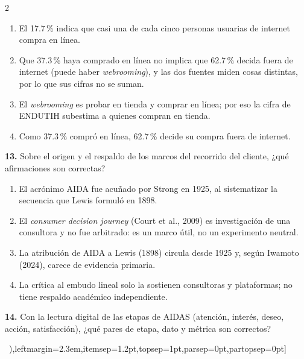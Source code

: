 \documentclass[10pt,letterpaper]{article}
\newcommand{\cas}{\framebox[1.0em]{\rule{0pt}{1.05ex}}}
\begin{document}
\begin{multicols}{2}
\begin{minipage}[t]{\columnwidth}
\begin{enumerate}[label=\cas\ \alph*),leftmargin=2.3em,itemsep=1.2pt,topsep=1pt,parsep=0pt,partopsep=0pt]
\item El 17.7\,\% indica que casi una de cada cinco personas usuarias de internet compra en línea.
\item Que 37.3\,\% haya comprado en línea no implica que 62.7\,\% decida fuera de internet (puede haber \textit{webrooming}), y las dos fuentes miden cosas distintas, por lo que sus cifras no se suman.
\item El \textit{webrooming} es probar en tienda y comprar en línea; por eso la cifra de ENDUTIH subestima a quienes compran en tienda.
\item Como 37.3\,\% compró en línea, 62.7\,\% decide su compra fuera de internet.
\end{enumerate}\end{minipage}\par\vspace{3pt}
\begin{minipage}[t]{\columnwidth}\noindent\textbf{13.} Sobre el origen y el respaldo de los marcos del recorrido del cliente, ¿qué afirmaciones son correctas?
\vspace{1pt}\begin{enumerate}[label=\cas\ \alph*),leftmargin=2.3em,itemsep=1.2pt,topsep=1pt,parsep=0pt,partopsep=0pt]
\item El acrónimo AIDA fue acuñado por Strong en 1925, al sistematizar la secuencia que Lewis formuló en 1898.
\item El \textit{consumer decision journey} (Court et al., 2009) es investigación de una consultora y no fue arbitrado: es un marco útil, no un experimento neutral.
\item La atribución de AIDA a Lewis (1898) circula desde 1925 y, según Iwamoto (2024), carece de evidencia primaria.
\item La crítica al embudo lineal solo la sostienen consultoras y plataformas; no tiene respaldo académico independiente.
\end{enumerate}\end{minipage}\par\vspace{3pt}
\begin{minipage}[t]{\columnwidth}\noindent\textbf{14.} Con la lectura digital de las etapas de AIDAS (atención, interés, deseo, acción, satisfacción), ¿qué pares de etapa, dato y métrica son correctos?
\vspace{1pt}\begin{enumerate}[label=\cas\ \alph*),leftmargin=2.3em,itemsep=1.2pt,topsep=1pt,parsep=0pt,partopsep=0pt]

\end{enumerate}
\end{minipage}
\end{multicols}
\end{document}
